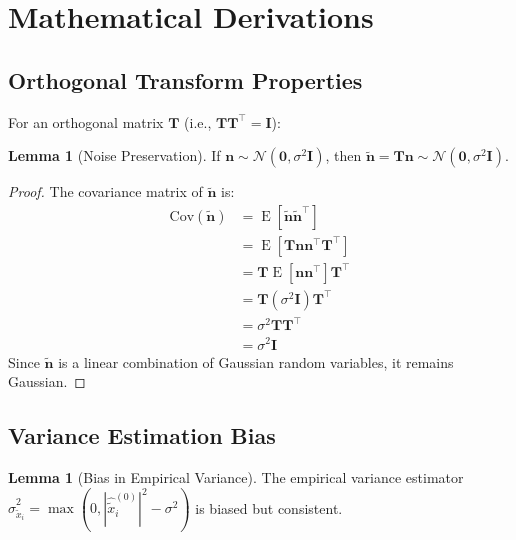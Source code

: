 \documentclass[12pt]{article}
\renewcommand{\vec}[1]{\mathbf{#1}}
\DeclareMathOperator{\E}{E}
\newcommand{\trans}[1]{#1^{\top}}
\theoremstyle{definition}
\newtheorem{lemma}[theorem]{Lemma}
\begin{document}
\section{Mathematical Derivations}
\label{app:derivations}

\subsection{Orthogonal Transform Properties}
\label{app:orthogonal_properties}

For an orthogonal matrix $\mathbf{T}$ (i.e., $\mathbf{T}\trans{\mathbf{T}} = \mathbf{I}$):

\begin{lemma}[Noise Preservation]
    \label{lemma:noise_preservation}
    If $\vec{n} \sim \mathcal{N}(\vec{0}, \sigma^2\mathbf{I})$, then $\tilde{\vec{n}} = \mathbf{T}\vec{n} \sim \mathcal{N}(\vec{0}, \sigma^2\mathbf{I})$.
\end{lemma}

\begin{proof}
    The covariance matrix of $\tilde{\vec{n}}$ is:
    \begin{align}
        \text{Cov}(\tilde{\vec{n}}) & = \E[\tilde{\vec{n}}\trans{\tilde{\vec{n}}}]             \\
                                    & = \E[\mathbf{T}\vec{n}\trans{\vec{n}}\trans{\mathbf{T}}] \\
                                    & = \mathbf{T}\E[\vec{n}\trans{\vec{n}}]\trans{\mathbf{T}} \\
                                    & = \mathbf{T}(\sigma^2\mathbf{I})\trans{\mathbf{T}}       \\
                                    & = \sigma^2\mathbf{T}\trans{\mathbf{T}}                   \\
                                    & = \sigma^2\mathbf{I}
    \end{align}
    Since $\tilde{\vec{n}}$ is a linear combination of Gaussian random variables, it remains Gaussian.
\end{proof}

\subsection{Variance Estimation Bias}
\label{app:variance_bias}

\begin{lemma}[Bias in Empirical Variance]
    \label{lemma:variance_bias}
    The empirical variance estimator $\hat{\sigma}_{\tilde{x}_i}^2 = \max(0, |\hat{\tilde{x}}_i^{(0)}|^2 - \sigma^2)$ is biased but consistent.
\end{lemma}
\end{document}
